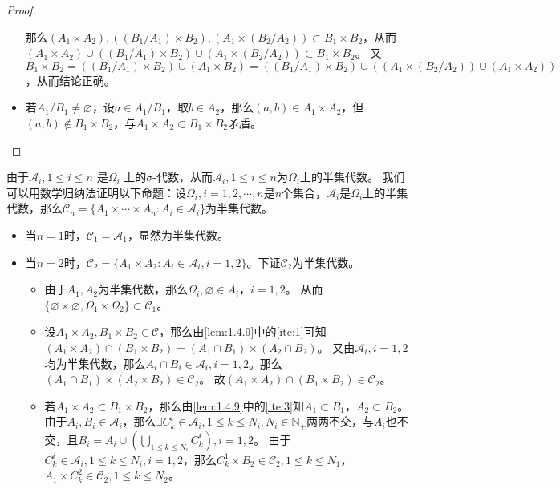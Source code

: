 \documentclass{ctexart}
\begin{document}
\begin{solution}
\begin{proof}
\begin{itemize}
       那么\((A_1 \times A_2) , ((B_1 / A_1) \times B_2) , (A_1 \times (B_2 / A_2)) \subset B_1 \times B_2\)，从而\( (A_1 \times A_2) \cup ((B_1 / A_1) \times B_2) \cup (A_1 \times (B_2 / A_2)) \subset B_1 \times B_2 \)。
       又\(B_1 \times B_2 =((B_1 /A_1) \times B_2)\cup (A_1 \times B_2) =((B_1 /A_1) \times B_2) \cup ((A_1 \times (B_2 / A_2)) \cup (A_1 \times A_2))  \)，从而结论正确。
     \item 若\(A_1 / B_1 \neq \varnothing \)，设\(a \in A_1/B_1 \)，取\(b \in A_2 \)，那么\((a,b) \in A_1 \times A_2 \)，但\((a,b) \notin B_1 \times B_2  \)，与\(A_1 \times A_2 \subset B_1 \times B_2 \)矛盾。
   \end{itemize}
 \end{proof}
由于\(\mathcal{A}_i,1 \leq i \leq n \) 是\(\Omega_i \)  上的\(\sigma \)-代数，从而\(\mathcal{A}_i,1 \leq i \leq n \)为\(\Omega_i \)上的半集代数。
我们可以用数学归纳法证明以下命题：设\(\Omega_i ,i=1,2,\cdots,n\)是\(n \)个集合，\(\mathcal{A}_i \)是\(\Omega_i \)上的半集代数，那么\(\mathcal{C}_n=\{A_1 \times \cdots \times A_n:A_i \in \mathcal{A}_i\} \)为半集代数。
\begin{itemize}
  \item 当\(n=1 \)时，\(\mathcal{C}_1=\mathcal{A}_1 \)，显然为半集代数。
  \item 当\(n=2 \)时，\(\mathcal{C}_2=\{A_1 \times A_2: A_i \in \mathcal{A}_i,i=1,2\} \)。下证\(\mathcal{C}_2 \)为半集代数。
    \begin{itemize}
      \item 由于\(A_1,A_2 \)为半集代数，那么\(\Omega_i, \varnothing \in A_i，i=1,2\)。
    从而\(\{\varnothing \times \varnothing , \Omega_1 \times \Omega_2\} \subset \mathcal{C}_1 \)。
  \item 设\(A_1 \times A_2, B_1 \times B_2 \in \mathcal{C} \)，那么由\ref{lem:1.4.9}中的\ref{ite:1}可知 \((A_1 \times A_2) \cap (B_1 \times B_2)=(A_1 \cap B_1) \times (A_2 \cap  B_2) \)。
    又由\(\mathcal{A}_i,i=1,2 \)均为半集代数，那么\(A_i \cap B_i \in \mathcal{A}_i, i=1,2 \)。那么\((A_1 \cap B_1) \times (A_2 \times B_2) \in \mathcal{C}_2  \)。
    故\((A_1 \times A_2) \cap (B_1 \times B_2) \in \mathcal{C}_2 \)。
  \item 若\(A_1 \times A_2 \subset B_1 \times B_2 \)，那么由\ref{lem:1.4.9}中的\ref{ite:3}知\(A_1 \subset B_1 \)，\(A_2 \subset B_2 \)。
    由于\(A_i, B_i \in \mathcal{A}_i\)，那么\(\exists C^i_k \in \mathcal{A}_i,1 \leq k \leq N_i, N_i \in \mathbb{N}_{+} \)两两不交，与\(A_i \)也不交，且\(B_i=A_i \cup (\bigcup_{1 \leq k \leq N_i} C^i_k),i=1,2\)。
    由于\(C^i_k \in \mathcal{A}_i, 1 \leq k \leq N_i,i=1,2\)，那么\(C^1_k \times B_2 \in \mathcal{C}_2, 1 \leq k \leq N_1 \)， \(A_1 \times C^2_k \in \mathcal{C}_2, 1 \leq k \leq N_2 \)。

\end{itemize}
\end{itemize}
\end{solution}
\end{document}
